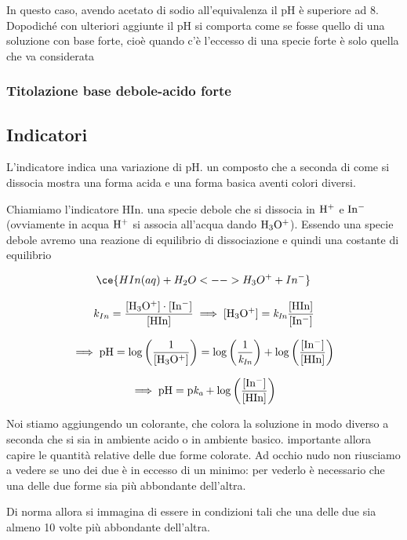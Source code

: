 In questo caso, avendo acetato di sodio all'equivalenza il pH è superiore ad 8. Dopodiché con ulteriori aggiunte il pH si comporta come se fosse quello di una soluzione con base forte, cioè quando c'è l'eccesso di una specie forte è solo quella che va considerata

\subsubsection{Titolazione base debole-acido forte}

\subsection{Indicatori}
L'indicatore indica una variazione di pH. \E un composto che a seconda di come si dissocia mostra una forma acida e una forma basica aventi colori diversi.

Chiamiamo l'indicatore HIn. \E una specie debole che si dissocia in $\rm H^+$ e $\rm In^-$ (ovviamente in acqua $\rm H^+$ si associa all'acqua dando $\rm H_3O^+$). Essendo una specie debole avremo una reazione di equilibrio di dissociazione e quindi una costante di equilibrio

$$\ce{HIn(aq) + H_2O <--> H_3O^+ + In^-}$$

$$k_{In}=\frac{\rm{[H_3O^+]} \cdot \rm{[In^-]}}{\rm{[HIn]}}\implies \rm{[H_3O^+]}=\textit{k}_{\textit{In}} \frac{\rm{[HIn]}}{\rm{[In^-]}}$$


$$\implies \rm pH = log \left( \frac{1}{[H_3O^+]} \right) = log \left( \frac{1}{\textit{k}_{\textit{In}}} \right) + log \left( \frac{\rm{[In^-]}}{\rm{[HIn]}} \right)$$

$$\implies \rm pH= p\textit{k}_\textit{a} + log \left( \frac{\rm{[In^-]}}{\rm{[HIn]}} \right)$$

Noi stiamo aggiungendo un colorante, che colora la soluzione in modo diverso a seconda che si sia in ambiente acido o in ambiente basico. \E importante allora capire le quantità relative delle due forme colorate. Ad occhio nudo non riusciamo a vedere se uno dei due è in eccesso di un minimo: per vederlo è necessario che una delle due forme sia più abbondante dell'altra.

Di norma allora si immagina di essere in condizioni tali che una delle due sia almeno 10 volte più abbondante dell'altra. 

